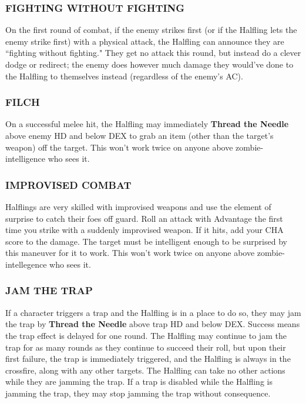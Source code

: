 \documentclass[twoside]{article}
\newcommand{\TTN}[2]{\textbf{Thread the Needle} above #1 and below #2}
\begin{document}
\subsubsection*{\footnotesize{F}\scriptsize{IGHTING WITHOUT} \footnotesize{F}\scriptsize{IGHTING}\normalsize}

On the first round of combat, if the enemy strikes first (or if the Halfling lets the enemy strike first) with a physical attack, the Halfling can announce they are ``fighting without fighting." They get no attack this round, but instead do a clever dodge or redirect; the enemy does however much damage they would've done to the Halfling to themselves instead (regardless of the enemy's AC).

\subsubsection*{\footnotesize{F}\scriptsize{ILCH}\normalsize}

On a successful melee hit, the Halfling may immediately \TTN{enemy HD}{DEX} to grab an item (other than the target's weapon) off the target. This won't work twice on anyone above zombie-intelligence who sees it.

\subsubsection*{\footnotesize{I}\scriptsize{MPROVISED} \footnotesize{C}\scriptsize{OMBAT}\normalsize}

Halflings are very skilled with improvised weapons and use the element of surprise to catch their foes off guard. Roll an attack with Advantage the first time you strike with a suddenly improvised weapon. If it hits, add your CHA score to the damage. The target must be intelligent enough to be surprised by this maneuver for it to work. This won't work twice on anyone above zombie-intellegence who sees it.

\subsubsection*{\footnotesize{J}\scriptsize{AM THE} \footnotesize{T}\scriptsize{RAP}\normalsize}

If a character triggers a trap and the Halfling is in a place to do so, they may jam the trap by \TTN{trap HD}{DEX}. Success means the trap effect is delayed for one round. The Halfling may continue to jam the trap for as many rounds as they continue to succeed their roll, but upon their first failure, the trap is immediately triggered, and the Halfling is always in the crossfire, along with any other targets. The Halfling can take no other actions while they are jamming the trap. If a trap is disabled while the Halfling is jamming the trap, they may stop jamming the trap without consequence.
\end{document}
